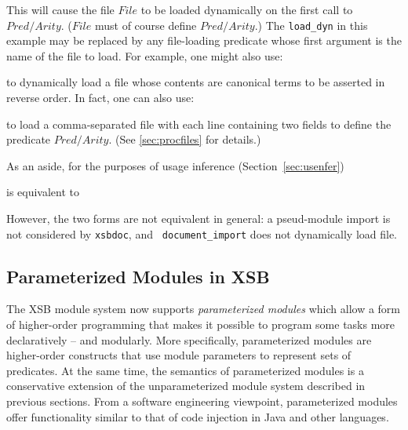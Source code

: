 
\noindent This will cause the file $File$ to be loaded dynamically on
the first call to $Pred/Arity$.  ($File$ must of course define
$Pred/Arity$.)  The {\tt load\_dyn} in this example may be replaced by
any file-loading predicate whose first argument is the name of the
file to load.  For example, one might also use:


\noindent to dynamically load a file whose contents are canonical
terms to be asserted in reverse order.  In fact, one can also use:


\noindent to load a comma-separated file with each line containing two
fields to define the predicate $Pred/Arity$.  (See \ref{sec:procfiles}
for details.)

As an aside, for the purposes of usage inference
(Section~\ref{sec:usenfer}) 


\noindent is equivalent to 

  
\noindent However, the two forms are not equivalent in general: a
pseud-module import is not considered by {\tt xsbdoc}, and {\tt
  document\_import} does not dynamically load file.

\subsection{Parameterized Modules in XSB}

The XSB module system now supports {\em parameterized modules} which
allow a form of higher-order programming that makes it possible to
program some tasks more declaratively -- and modularly.  More
specifically, parameterized modules are higher-order constructs that
use module parameters to represent sets of predicates.  At the same
time, the semantics of parameterized modules is a conservative
extension of the unparameterized module system described in previous
sections. From a software engineering viewpoint, parameterized modules
offer functionality similar to that of code injection in Java and
other languages.

